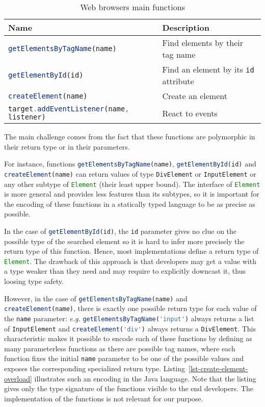\documentclass{llncs}
\newcommand{\jscode}[1]{\lstinline[language=JavaScript]|#1|}
\begin{document}
\begin{table}
 \centering
 \begin{tabular}{ll}
  \hline
  Name & Description \\
  \hline
  \jscode{getElementsByTagName(name)} & Find elements by their tag name \\
  \jscode{getElementById(id)} & Find an element by its \jscode{id} attribute \\
  \jscode{createElement(name)} & Create an element \\
  \jscode{target.addEventListener(name, listener)} & React to events \\
  \hline
 \end{tabular}

 \label{table-dom-api}
 \caption{Web browsers main functions}
\end{table}

The main challenge comes from the fact that these functions are polymorphic in their return type or in their parameters.

For instance, functions \jscode{getElementsByTagName(name)}, \jscode{getElementById(id)} and \jscode{createElement(name)} can return values of type \jscode{DivElement} or \jscode{InputElement} or any other subtype of \jscode{Element} (their least upper bound). The interface of \jscode{Element} is more general and provides less features than its subtypes, so it is important for the encoding of these functions in a statically typed language to be as precise as possible.

In the case of \jscode{getElementById(id)}, the \jscode{id} parameter gives no clue on the possible type of the searched element so it is hard to infer more precisely the return type of this function. Hence, most implementations define a return type of \jscode{Element}. The drawback of this approach is that developers may get a value with a type weaker than they need and may require to explicitly downcast it, thus loosing type safety.

However, in the case of \jscode{getElementsByTagName(name)} and \jscode{createElement(name)}, there is exactly one possible return type for each value of the \jscode{name} parameter: \emph{e.g.} \jscode{getElementsByTagName('input')} always returns a list of \jscode{InputElement} and \jscode{createElement('div')} always returns a \jscode{DivElement}. This characteristic makes it possible to encode each of these functions by defining as many parameterless functions as there are possible tag names, where each function fixes the initial \jscode{name} parameter to be one of the possible values and exposes the corresponding specialized return type. Listing~\ref{lst-create-element-overload} illustrates such an encoding in the Java language. Note that the listing gives only the type signature of the functions visible to the end developers. The implementation of the functions is not relevant for our purpose.
\end{document}
